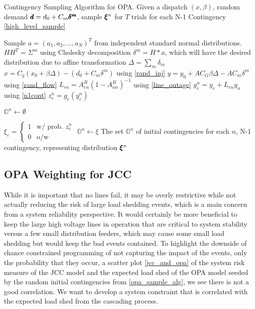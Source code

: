 \begin{algorithm}
\caption[Contingency sampling algorithm for OPA]{Contingency Sampling Algorithm for OPA.  Given a dispatch $(x, \beta)$, random demand $\pmb{d}=d_0 + C_m \pmb{\delta^m}$, sample $\pmb{\xi}^n$ for $T$ trials for each N-1 Contingency \cref{high_level_sample}}\label{opa_sample_alg}
\begin{algorithmic}
\State Sample $a=(a_1,a_2,...,a_N)^T$ from independent standard normal distributions.
\State $H H^T = \Sigma^m$ using Cholesky decomposition
\State $\delta^m = H * a$, which will have the desired distribution due to affine transformation
\State $\Delta = \sum_m \delta_m$
\State $x=C_g(x_0 + \beta \Delta)  -(d_0 + C_m \delta^m)$ using \cref{rand_inj} 
\State $y=y_0 + A C_G \beta \Delta - A C_m \delta^m$ using \cref{rand_flow}
\State $L_{e n} = A^B_{en}(1-A^B_{nn})^{-1}$ using \cref{line_outage}
\State $y_e^n = y_e + L_{e n} y_n$  using \cref{n1cont}
\State $z_e^n = g_e (y_e^n)$

\State $\mathbb{O}^n \gets \emptyset$

\State $\xi_e = 
\left\{ 
\begin{array}{lr}
  1 & \mbox{w/ prob. } z_e^n \\
  0 & \mbox{o/w }
\end{array}
\right. $ 
\EndFor
\State $\mathbb{O}^n \gets \xi$
\EndFor
\EndFor
\State The set $\mathbb{O}^n$ of initial contingencies for each $n$, N-1 contingency, representing distribution $\pmb{\xi}^n$
\EndProcedure
\end{algorithmic}
\end{algorithm}





\subsection{OPA Weighting for JCC}


While it is important that no lines fail, it may be overly restrictive while not actually reducing the risk of large load shedding events, which is a main concern from a system reliability perspective. It would certainly be more beneficial to keep the large high voltage lines in operation that are critical to system stability versus a few small distribution feeders, which may cause some small load shedding but would keep the bad events contained.  To highlight the downside of chance constrained programming of not capturing the impact of the events, only the probability that they occur, a scatter plot \cref{jcc_and_opa} of the system risk measure of the JCC model and the expected load shed of the OPA model seeded by the random initial contingencies from \cref{opa_sample_alg}, we see there is not a good correlation.  We want to develop a system constraint that is correlated with the expected load shed from the cascading process.

